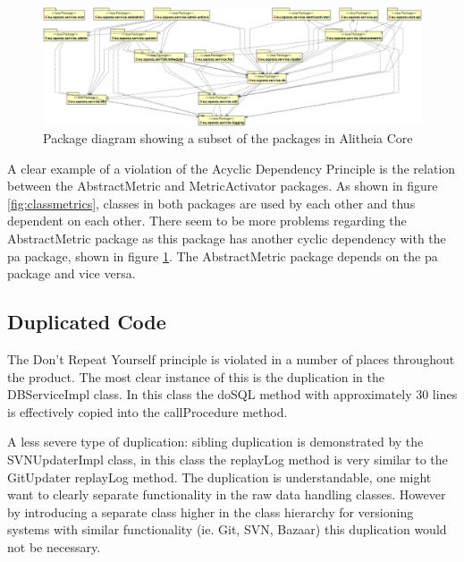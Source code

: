 \documentclass[a4paper,11pt,titlepage]{article}
\begin{document}
\begin{figure}
\includegraphics[scale=0.25]{package_diagram_core_no_impl_no_core}
\centering
\caption{Package diagram showing a subset of the packages in Alitheia Core}
\label{fig:package}
\end{figure}

A clear example of a violation of the Acyclic Dependency Principle is the relation between the AbstractMetric and MetricActivator packages. As shown in figure \ref{fig:classmetrics}, classes in both packages are used by each other and thus dependent on each other. There seem to be more problems regarding the AbstractMetric package as this package has another cyclic dependency with the pa package, shown in figure \ref{fig:package}. The AbstractMetric package depends on the pa package and vice versa.

\subsection{Duplicated Code}
The Don't Repeat Yourself principle is violated in a number of places throughout the product. The most clear instance of this is the duplication in the DBServiceImpl class. In this class the doSQL method with approximately 30 lines is effectively copied into the callProcedure method.

A less severe type of duplication: sibling duplication is demonstrated by the SVNUpdaterImpl class, in this class the replayLog method is very similar to the GitUpdater replayLog method. The duplication is understandable, one might want to clearly separate functionality in the raw data handling classes. However by introducing a separate class higher in the class hierarchy for versioning systems with similar functionality (ie. Git, SVN, Bazaar) this duplication would not be necessary.
\end{document}
